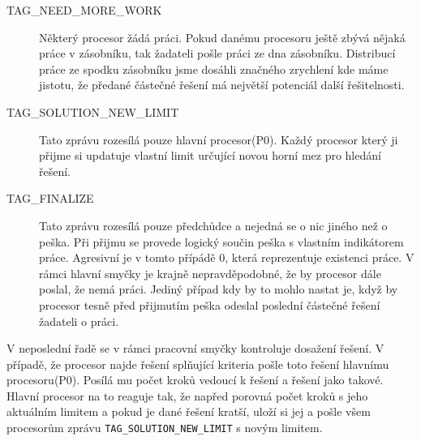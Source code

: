 \documentclass[12pt]{article}
\begin{document}
\begin{description}
  \item [TAG\_NEED\_MORE\_WORK] Některý procesor žádá práci. Pokud danému 
procesoru ještě zbývá nějaká práce v zásobníku, tak žadateli pošle práci ze 
dna zásobníku. Distribucí práce ze spodku zásobníku jsme dosáhli značného 
zrychlení kde máme jistotu, že předané částečné řešení má největší potenciál 
další řešitelnosti.
  \item [TAG\_SOLUTION\_NEW\_LIMIT] Tato zprávu rozesílá pouze hlavní
procesor(P0). Každý procesor který ji přijme si updatuje vlastní limit určující
novou horní mez pro hledání řešení. 
  \item [TAG\_FINALIZE] Tato zprávu rozesílá pouze předchůdce a nejedná
se o nic jiného než o peška. Při přijmu se provede logický součin peška s
vlastním indikátorem práce. Agresivní je v tomto přípádě 0, která reprezentuje
existenci práce. V rámci hlavní smyčky je krajně nepravděpodobné, že by procesor
dále poslal, že nemá práci. Jediný případ kdy by to mohlo nastat je, když by
procesor tesně před přijmutím peška odeslal poslední částečné řešení žadateli o
práci.
\end{description}
V neposlední řadě se v rámci pracovní smyčky kontroluje dosažení řešení. V
případě, že procesor najde řešení splňující kriteria pošle toto řešení hlavnímu
procesoru(P0). Posílá mu počet kroků vedoucí k řešení a řešení jako takové.
Hlavní procesor na to reaguje tak, že napřed porovná počet kroků s jeho
aktuálním limitem a pokud je dané řešení kratší, uloží si jej a pošle všem
procesorům zprávu \verb|TAG_SOLUTION_NEW_LIMIT| s novým limitem.
\end{document}
